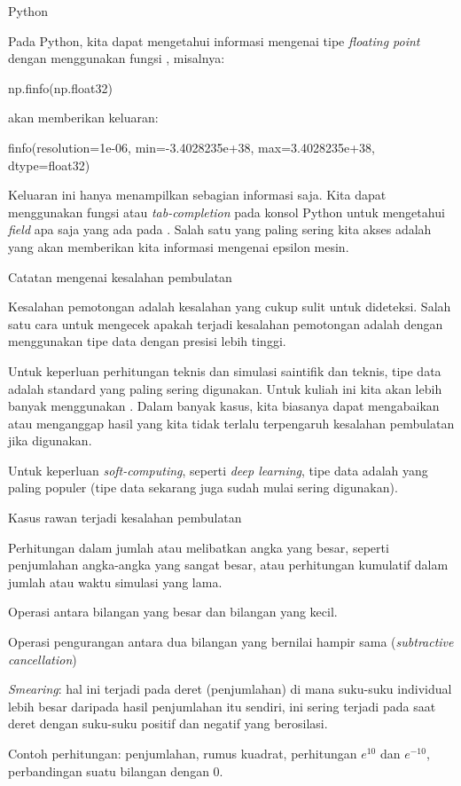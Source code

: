 \begin{frame}[fragile]{Python}

Pada Python, kita dapat mengetahui informasi mengenai tipe \textit{floating point}
dengan menggunakan fungsi , misalnya:
\begin{pythoncode}
np.finfo(np.float32)
\end{pythoncode}
akan memberikan keluaran:
\begin{textcode}
finfo(resolution=1e-06, min=-3.4028235e+38, max=3.4028235e+38, dtype=float32)
\end{textcode}
Keluaran ini hanya menampilkan sebagian informasi saja. Kita dapat menggunakan
fungsi  atau \textit{tab-completion} pada konsol Python
untuk mengetahui \textit{field} apa saja yang ada pada .
Salah satu yang paling sering kita akses adalah 
yang akan memberikan kita informasi mengenai epsilon mesin.

\end{frame}


\begin{frame}{Catatan mengenai kesalahan pembulatan}

Kesalahan pemotongan adalah kesalahan yang cukup sulit untuk dideteksi.
Salah satu cara untuk mengecek apakah terjadi kesalahan pemotongan adalah
dengan menggunakan tipe data dengan presisi lebih tinggi.

Untuk keperluan perhitungan teknis dan simulasi saintifik dan teknis,
tipe data  adalah standard yang paling sering digunakan.
Untuk kuliah ini kita akan lebih banyak menggunakan .
Dalam banyak kasus, kita biasanya dapat mengabaikan atau menganggap hasil
yang kita tidak terlalu terpengaruh kesalahan pembulatan jika
 digunakan.

Untuk keperluan \textit{soft-computing}, seperti \textit{deep learning},
tipe data  adalah yang paling populer (tipe data
 sekarang juga sudah mulai sering digunakan).

\end{frame}


\begin{frame}{Kasus rawan terjadi kesalahan pembulatan}

Perhitungan dalam jumlah atau melibatkan angka yang besar, seperti
penjumlahan angka-angka yang sangat besar, atau perhitungan kumulatif
dalam jumlah atau waktu simulasi yang lama.

Operasi antara bilangan yang besar dan bilangan yang kecil.

Operasi pengurangan antara dua bilangan yang bernilai hampir sama
(\textit{subtractive cancellation})

\textit{Smearing}: hal ini terjadi pada deret (penjumlahan) di mana
suku-suku individual lebih besar daripada hasil penjumlahan itu sendiri,
ini sering terjadi pada saat deret dengan suku-suku positif dan negatif
yang berosilasi.

Contoh perhitungan: penjumlahan, rumus kuadrat, perhitungan $e^{10}$
dan $e^{-10}$, perbandingan suatu bilangan dengan 0.

\end{frame}

